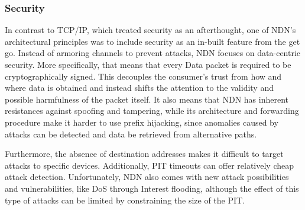 %
%
%

\subsubsection{Security}
In contrast to TCP/IP, which treated security as an afterthought, one of NDN's architectural principles was to include security as an in-built feature from the get go. \cite{ZEBJ10} Instead of armoring channels to prevent attacks, NDN focuses on data-centric security. More specifically, that means that every Data packet is required to be cryptographically signed. This decouples the consumer's trust from how and where data is obtained and instead shifts the attention to the validity and possible harmfulness of the packet itself. It also means that NDN has inherent resistances against spoofing and tampering, while its architecture and forwarding procedure make it harder to use prefix hijacking, since anomalies caused by attacks can be detected and data be retrieved from alternative paths. 

Furthermore, the absence of destination addresses makes it difficult to target attacks to specific devices. Additionally, PIT timeouts can offer relatively cheap attack detection. Unfortunately, NDN also comes with new attack possibilities and vulnerabilities, like DoS through Interest flooding, although the effect of this type of attacks can be limited by constraining the size of the PIT. \cite{ZABJ14}
